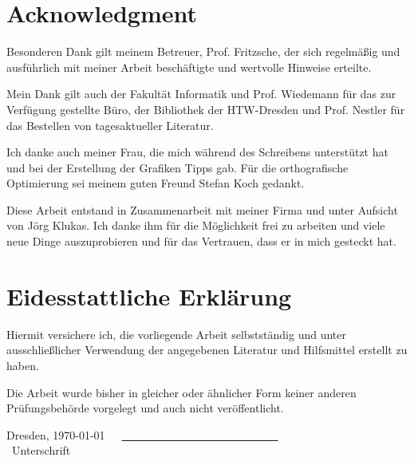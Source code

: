 \tableofcontents		%
\section*{Acknowledgment}
 
Besonderen Dank gilt meinem Betreuer, Prof. Fritzsche, der sich regelmäßig und ausführlich mit meiner Arbeit beschäftigte und wertvolle Hinweise erteilte.

Mein Dank gilt auch der Fakultät Informatik und Prof. Wiedemann für das zur Verfügung gestellte Büro, der Bibliothek der HTW-Dresden und Prof. Nestler für das Bestellen von tagesaktueller Literatur.
 
Ich danke auch meiner Frau, die mich während des Schreibens unterstützt hat und bei der Erstellung der Grafiken Tipps gab. Für die orthografische Optimierung sei meinem guten Freund Stefan Koch gedankt.
 
Diese Arbeit entstand in Zusammenarbeit mit meiner Firma und unter Aufsicht von Jörg Klukas. Ich danke ihm für die Möglichkeit frei zu arbeiten und viele neue Dinge auszuprobieren und für das Vertrauen, dass er in mich gesteckt hat.
 

\section*{Eidesstattliche Erklärung}
	Hiermit versichere ich, die vorliegende Arbeit selbstständig und unter ausschließlicher Verwendung
	der angegebenen Literatur und Hilfsmittel erstellt zu haben.

	Die Arbeit wurde bisher in gleicher oder ähnlicher Form keiner anderen Prüfungsbehörde vorgelegt
	und auch nicht veröffentlicht.

	Dresden, \today \ \ \ \underline{\ \ \ \ \ \ \ \ \ \ \ \ \ \ \ \ \ \ \ \ \ \ \ \ \ \ \ \ }\\
	\hspace*{12em}\small{\ Unterschrift} 

